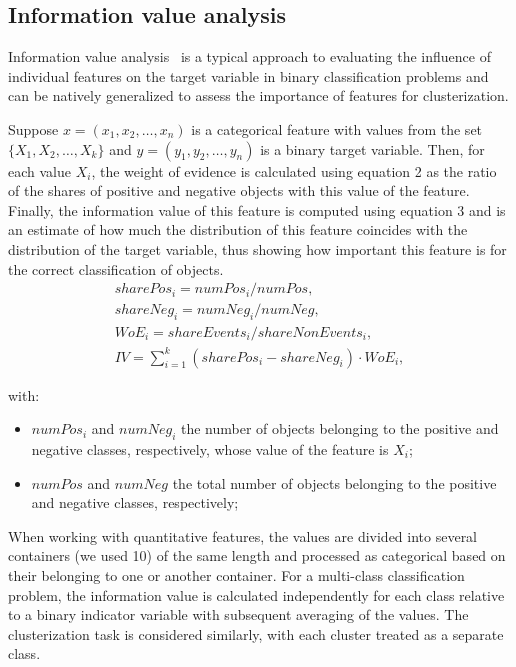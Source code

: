 \documentclass[shortAfour,times,sagev]{sagej}
\begin{document}
\subsection{Information value analysis}

Information value analysis~\cite{InformationValue} is a typical approach to evaluating the influence of individual features on the target variable in binary classification problems and can be natively generalized to assess the importance of features for clusterization.

Suppose $x=(x_1, x_2, \ldots, x_n)$ is a categorical feature with values from the set $\{ X_1, X_2, \ldots, X_k \}$ and $y=(y_1, y_2, \ldots, y_n)$ is a binary target variable. Then, for each value $X_i$, the weight of evidence is calculated using equation 2 as the ratio of the shares of positive and negative objects with this value of the feature. Finally, the information value of this feature is computed using equation 3 and is an estimate of how much the distribution of this feature coincides with the distribution of the target variable, thus showing how important this feature is for the correct classification of objects.
\begin{eqnarray}
    sharePos_i = numPos_i / numPos, \nonumber\\
    shareNeg_i = numNeg_i / numNeg, \nonumber\\
    WoE_i = shareEvents_i / shareNonEvents_i, \label{eq2}\\
    IV = \sum_{i = 1}^{k} (sharePos_i - shareNeg_i) \cdot WoE_i, \label{eq3}
\end{eqnarray}

with:
\begin{itemize}
    \item
$numPos_i$ and $numNeg_i$ the number of objects belonging to the positive and negative classes, respectively, whose value of the feature is $X_i$;
    \item
$numPos$ and $numNeg$ the total number of objects belonging to the positive and negative classes, respectively;
\end{itemize}

When working with quantitative features, the values are divided into several containers (we used 10) of the same length and processed as categorical based on their belonging to one or another container. For a multi-class classification problem, the information value is calculated independently for each class relative to a binary indicator variable with subsequent averaging of the values. The clusterization task is considered similarly, with each cluster treated as a separate class.
\end{document}
